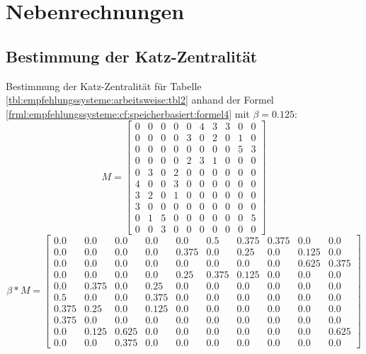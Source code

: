 \chapter{Nebenrechnungen}
\label{ch:nebenrechnungen}
\section{Bestimmung der Katz-Zentralität}
\label{ch:nebenrechnungen:katzZentralitaet}
Bestimmung der Katz-Zentralität für Tabelle \ref{tbl:empfehlungssysteme:arbeitsweise:tbl2} anhand der Formel \ref{frml:empfehlungssysteme:cf:speicherbasiert:formel4} mit $\beta = 0.125$:
\begin{equation}
	M = \begin{bmatrix}
		0 & 0 & 0 & 0 & 0 & 4 & 3 & 3 & 0 & 0\\
		0 & 0 & 0 & 0 & 3 & 0 & 2 & 0 & 1 & 0\\
		0 & 0 & 0 & 0 & 0 & 0 & 0 & 0 & 5 & 3\\
		0 & 0 & 0 & 0 & 2 & 3 & 1 & 0 & 0 & 0\\
		0 & 3 & 0 & 2 & 0 & 0 & 0 & 0 & 0 & 0\\
		4 & 0 & 0 & 3 & 0 & 0 & 0 & 0 & 0 & 0\\
		3 & 2 & 0 & 1 & 0 & 0 & 0 & 0 & 0 & 0\\
		3 & 0 & 0 & 0 & 0 & 0 & 0 & 0 & 0 & 0\\
		0 & 1 & 5 & 0 & 0 & 0 & 0 & 0 & 0 & 5\\
		0 & 0 & 3 & 0 & 0 & 0 & 0 & 0 & 0 & 0
	\end{bmatrix}
	\label{frml:berechnungDerKatzZentralitaet:formel1}
\end{equation}
\begin{equation}
	\beta * M = \begin{bmatrix}
		0.0 & 0.0 & 0.0 & 0.0 & 0.0 & 0.5 & 0.375 & 0.375 & 0.0 & 0.0\\
		0.0 & 0.0 & 0.0 & 0.0 & 0.375 & 0.0 & 0.25 & 0.0 & 0.125 & 0.0\\
		0.0 & 0.0 & 0.0 & 0.0 & 0.0 & 0.0 & 0.0 & 0.0 & 0.625 & 0.375\\
		0.0 & 0.0 & 0.0 & 0.0 & 0.25 & 0.375 & 0.125 & 0.0 & 0.0 & 0.0\\
		0.0 & 0.375 & 0.0 & 0.25 & 0.0 & 0.0 & 0.0 & 0.0 & 0.0 & 0.0\\
		0.5 & 0.0 & 0.0 & 0.375 & 0.0 & 0.0 & 0.0 & 0.0 & 0.0 & 0.0\\
		0.375 & 0.25 & 0.0 & 0.125 & 0.0 & 0.0 & 0.0 & 0.0 & 0.0 & 0.0\\
		0.375 & 0.0 & 0.0 & 0.0 & 0.0 & 0.0 & 0.0 & 0.0 & 0.0 & 0.0\\
		0.0 & 0.125 & 0.625 & 0.0 & 0.0 & 0.0 & 0.0 & 0.0 & 0.0 & 0.625\\
		0.0 & 0.0 & 0.375 & 0.0 & 0.0 & 0.0 & 0.0 & 0.0 & 0.0 & 0.0
	\end{bmatrix}
	\label{frml:berechnungDerKatzZentralitaet:formel2}
\end{equation}
